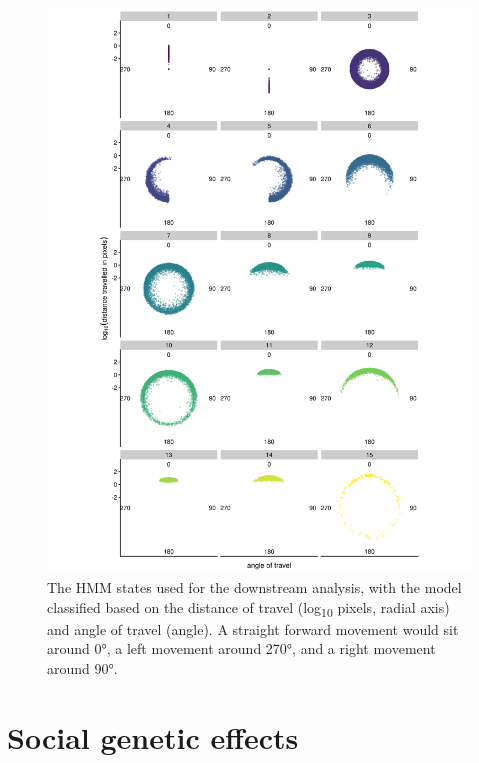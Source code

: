 \documentclass[
]{book}
\begin{document}
\begin{figure}
\includegraphics[width=1\linewidth]{figs/mikk_behaviour/0.08_15_polar_all_dge} \caption{The HMM states used for the downstream analysis, with the model classified based on the distance of travel (log\textsubscript{10} pixels, radial axis) and angle of travel (angle). A straight forward movement would sit around 0°, a left movement around 270°, and a right movement around 90°.}\label{fig:mikk-hmm-sym}
\end{figure}

\clearpage

\hypertarget{social-genetic-effects}{%
\section{Social genetic effects}\label{social-genetic-effects}}
\end{document}
